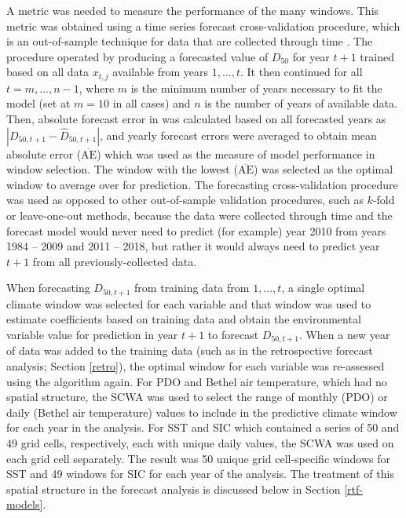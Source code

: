 \documentclass[12pt,]{book}
\theoremstyle{definition}
\theoremstyle{definition}
\theoremstyle{definition}
\theoremstyle{remark}
\begin{document}
A metric was needed to measure the performance of the many windows. This
metric was obtained using a time series forecast cross-validation
procedure, which is an out-of-sample technique for data that are
collected through time \citep{arlot-celisse-2010}. The procedure
operated by producing a forecasted value of \(D_{50}\) for year \(t+1\)
trained based on all data \(x_{t,j}\) available from years
\(1, ..., t\). It then continued for all \(t = m, ..., n-1\), where
\(m\) is the minimum number of years necessary to fit the model (set at
\(m = 10\) in all cases) and \(n\) is the number of years of available
data. Then, absolute forecast error in was calculated based on all
forecasted years as \(|D_{50,t+1} - \hat{D}_{50,t+1}|\), and yearly
forecast errors were averaged to obtain mean absolute error
(\(\overline{\text{AE}}\)) which was used as the measure of model
performance in window selection. The window with the lowest
(\(\overline{\text{AE}}\)) was selected as the optimal window to average
over for prediction. The forecasting cross-validation procedure was used
as opposed to other out-of-sample validation procedures, such as
\(k\)-fold or leave-one-out methods, because the data were collected
through time and the forecast model would never need to predict (for
example) year 2010 from years 1984 -- 2009 and 2011 -- 2018, but rather
it would always need to predict year \(t+1\) from all
previously-collected data.

When forecasting \(D_{50,t+1}\) from training data from \(1,...,t\), a
single optimal climate window was selected for each variable and that
window was used to estimate coefficients based on training data and
obtain the environmental variable value for prediction in year \(t+1\)
to forecast \(D_{50,t+1}\). When a new year of data was added to the
training data (such as in the retrospective forecast analysis; Section
\ref{retro}), the optimal window for each variable was re-assessed using
the algorithm again. For PDO and Bethel air temperature, which had no
spatial structure, the SCWA was used to select the range of monthly
(PDO) or daily (Bethel air temperature) values to include in the
predictive climate window for each year in the analysis. For SST and SIC
which contained a series of 50 and 49 grid cells, respectively, each
with unique daily values, the SCWA was used on each grid cell
separately. The result was 50 unique grid cell-specific windows for SST
and 49 windows for SIC for each year of the analysis. The treatment of
this spatial structure in the forecast analysis is discussed below in
Section \ref{rtf-models}.
\end{document}
